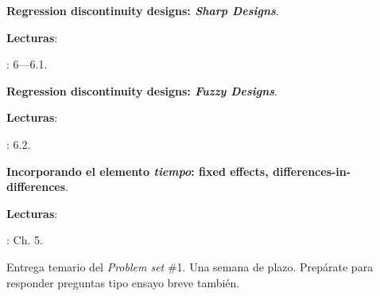 \documentclass[letterpaper]{article}
\renewenvironment{itemize}{
  \begin{list}{}{
    \setlength{\leftmargin}{1.5em}
  }
}{
  \end{list}
}
\begin{document}
\begin{enumerate}[label=\roman*.]
          \begin{itemize} 
            \item[4.] {\bf Regression discontinuity designs: \emph{Sharp Designs}}.
                \begin{itemize} 
                \item[$\circ$] {\bf Lecturas}: 
                  \begin{itemize} 
                    \item[$\diamond$] \textcite{Angrist2009}: 6---6.1.
                  \end{itemize}
                \end{itemize}
            \end{itemize}


            \begin{itemize} 
            \item[5.] {\bf Regression discontinuity designs: \emph{Fuzzy Designs}}.
                \begin{itemize} 
                \item[$\circ$] {\bf Lecturas}: 
                  \begin{itemize} 
                    \item[$\diamond$] \textcite{Angrist2009}: 6.2.
                  \end{itemize}
                \end{itemize}
            \end{itemize}


            \begin{itemize} 
            \item[6.] {\bf Incorporando el elemento \emph{tiempo}: fixed effects, differences-in-differences}.
                \begin{itemize} 
                \item[$\circ$] {\bf Lecturas}: 
                  \begin{itemize} 
                    \item[$\diamond$] \textcite{Angrist2009}: Ch. 5.
                  \end{itemize}
                \end{itemize}
            \end{itemize}

\item[{\color{red}\Pointinghand}] Entrega temario del \emph{Problem set} \#1. Una semana de plazo. Prep\'arate para responder preguntas tipo ensayo breve tambi\'en.


\end{enumerate}
\end{document}
